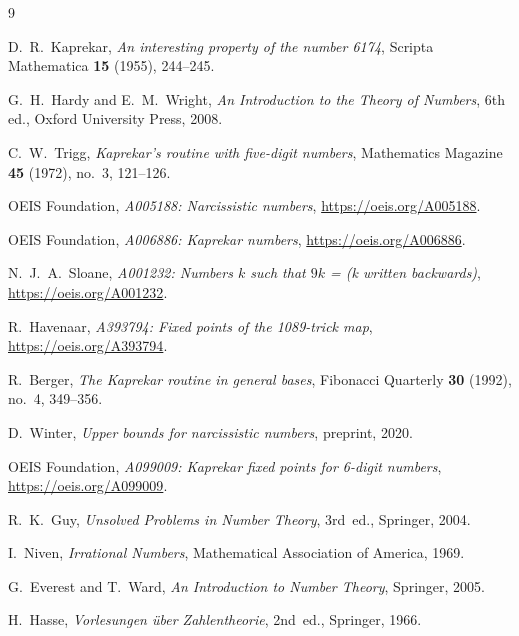 \documentclass[11pt,a4paper]{amsart}
\theoremstyle{plain}
\theoremstyle{definition}
\theoremstyle{remark}
\begin{document}
\begin{thebibliography}{9}

D.~R.~Kaprekar,
\emph{An interesting property of the number 6174},
Scripta Mathematica \textbf{15} (1955), 244--245.

G.~H.~Hardy and E.~M.~Wright,
\emph{An Introduction to the Theory of Numbers},
6th ed., Oxford University Press, 2008.

C.~W.~Trigg,
\emph{Kaprekar's routine with five-digit numbers},
Mathematics Magazine \textbf{45} (1972), no.~3, 121--126.

OEIS Foundation,
\emph{A005188: Narcissistic numbers},
\url{https://oeis.org/A005188}.

OEIS Foundation,
\emph{A006886: Kaprekar numbers},
\url{https://oeis.org/A006886}.

N.~J.~A.~Sloane,
\emph{A001232: Numbers $k$ such that $9k$ = (k written backwards)},
\url{https://oeis.org/A001232}.

R.~Havenaar,
\emph{A393794: Fixed points of the 1089-trick map},
\url{https://oeis.org/A393794}.

R.~Berger,
\emph{The Kaprekar routine in general bases},
Fibonacci Quarterly \textbf{30} (1992), no.~4, 349--356.

D.~Winter,
\emph{Upper bounds for narcissistic numbers},
preprint, 2020.

OEIS Foundation,
\emph{A099009: Kaprekar fixed points for 6-digit numbers},
\url{https://oeis.org/A099009}.

R.~K.~Guy,
\emph{Unsolved Problems in Number Theory},
3rd~ed., Springer, 2004.

I.~Niven,
\emph{Irrational Numbers},
Mathematical Association of America, 1969.

G.~Everest and T.~Ward,
\emph{An Introduction to Number Theory},
Springer, 2005.

H.~Hasse,
\emph{Vorlesungen {\"u}ber Zahlentheorie},
2nd~ed., Springer, 1966.

\end{thebibliography}
\end{document}
